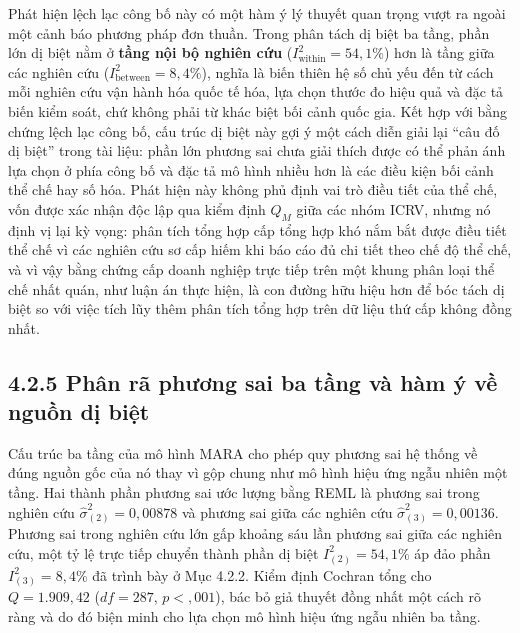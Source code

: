 \documentclass[
  a4paper,
  13pt]{extreport}
\begin{document}
Phát hiện lệch lạc công bố này có một hàm ý lý thuyết quan trọng vượt ra
ngoài một cảnh báo phương pháp đơn thuần. Trong phân tách dị biệt ba
tầng, phần lớn dị biệt nằm ở \textbf{tầng nội bộ nghiên cứu}
(\(I^2_{\text{within}} = 54{,}1\%\)) hơn là tầng giữa các nghiên cứu
(\(I^2_{\text{between}} = 8{,}4\%\)), nghĩa là biến thiên hệ số chủ yếu
đến từ cách mỗi nghiên cứu vận hành hóa quốc tế hóa, lựa chọn thước đo
hiệu quả và đặc tả biến kiểm soát, chứ không phải từ khác biệt bối cảnh
quốc gia. Kết hợp với bằng chứng lệch lạc công bố, cấu trúc dị biệt này
gợi ý một cách diễn giải lại ``câu đố dị biệt'' trong tài liệu: phần lớn
phương sai chưa giải thích được có thể phản ánh lựa chọn ở phía công bố
và đặc tả mô hình nhiều hơn là các điều kiện bối cảnh thể chế hay số
hóa. Phát hiện này không phủ định vai trò điều tiết của thể chế, vốn
được xác nhận độc lập qua kiểm định \(Q_M\) giữa các nhóm ICRV, nhưng nó
định vị lại kỳ vọng: phân tích tổng hợp cấp tổng hợp khó nắm bắt được
điều tiết thể chế vì các nghiên cứu sơ cấp hiếm khi báo cáo đủ chi tiết
theo chế độ thể chế, và vì vậy bằng chứng cấp doanh nghiệp trực tiếp
trên một khung phân loại thể chế nhất quán, như luận án thực hiện, là
con đường hữu hiệu hơn để bóc tách dị biệt so với việc tích lũy thêm
phân tích tổng hợp trên dữ liệu thứ cấp không đồng nhất.

\hypertarget{phuxe2n-ruxe3-phux1b0ux1a1ng-sai-ba-tux1ea7ng-vuxe0-huxe0m-uxfd-vux1ec1-nguux1ed3n-dux1ecb-biux1ec7t}{%
\subsection{4.2.5 Phân rã phương sai ba tầng và hàm ý về nguồn dị
biệt}\label{phuxe2n-ruxe3-phux1b0ux1a1ng-sai-ba-tux1ea7ng-vuxe0-huxe0m-uxfd-vux1ec1-nguux1ed3n-dux1ecb-biux1ec7t}}

Cấu trúc ba tầng của mô hình MARA cho phép quy phương sai hệ thống về
đúng nguồn gốc của nó thay vì gộp chung như mô hình hiệu ứng ngẫu nhiên
một tầng. Hai thành phần phương sai ước lượng bằng REML là phương sai
trong nghiên cứu \(\hat{\sigma}^2_{(2)} = 0{,}00878\) và phương sai giữa
các nghiên cứu \(\hat{\sigma}^2_{(3)} = 0{,}00136\). Phương sai trong
nghiên cứu lớn gấp khoảng sáu lần phương sai giữa các nghiên cứu, một tỷ
lệ trực tiếp chuyển thành phần dị biệt \(I^2_{(2)} = 54{,}1\%\) áp đảo
phần \(I^2_{(3)} = 8{,}4\%\) đã trình bày ở Mục 4.2.2. Kiểm định Cochran
tổng cho \(Q = 1.909{,}42\) (\(df = 287\), \(p < {,}001\)), bác bỏ giả
thuyết đồng nhất một cách rõ ràng và do đó biện minh cho lựa chọn mô
hình hiệu ứng ngẫu nhiên ba tầng.
\end{document}
